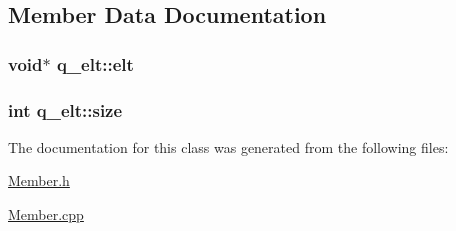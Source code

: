 \subsection{\-Member \-Data \-Documentation}
\hypertarget{classq__elt_af5c6e77b0120360ce34133329172710f}{
\subsubsection[{elt}]{\setlength{\rightskip}{0pt plus 5cm}void$\ast$ {\bf q\-\_\-elt\-::elt}}}\label{d2/d7b/classq__elt_af5c6e77b0120360ce34133329172710f}
\hypertarget{classq__elt_a3bce6f7fbb1df783283e8d7654ca63e0}{
\subsubsection[{size}]{\setlength{\rightskip}{0pt plus 5cm}int {\bf q\-\_\-elt\-::size}}}\label{d2/d7b/classq__elt_a3bce6f7fbb1df783283e8d7654ca63e0}


\-The documentation for this class was generated from the following files\-:\begin{DoxyCompactItemize}
\item 
\hyperlink{_member_8h}{\-Member.\-h}\item 
\hyperlink{_member_8cpp}{\-Member.\-cpp}\end{DoxyCompactItemize}

